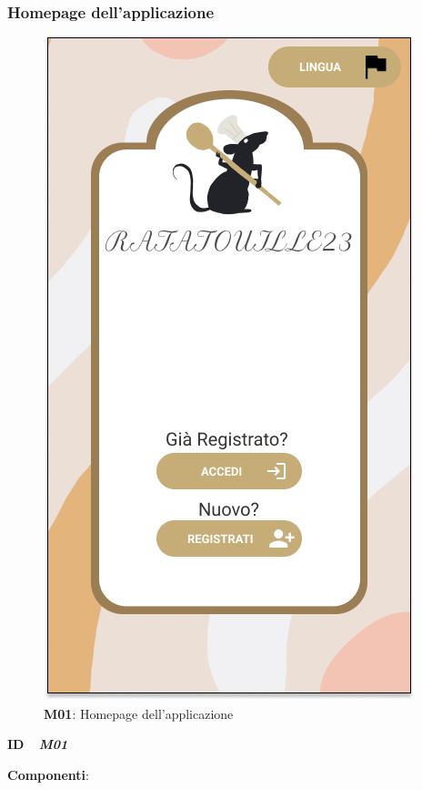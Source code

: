     \subsubsection{Homepage dell'applicazione}
        \begin{figure}[H]
          \centering
          \includegraphics[scale=0.5]{assets/diagrammi/Mockup/Mockup_Homepage.png}
          \caption{\textbf{M01}: Homepage dell'applicazione}
          \label{fig:Mockup_Homepage}
        \end{figure}
        \begin{flushleft}
            \textbf{ID} \ \Large{ \emph{\textbf{M01}}}\\
        \end{flushleft}

        \textbf{Componenti}:

